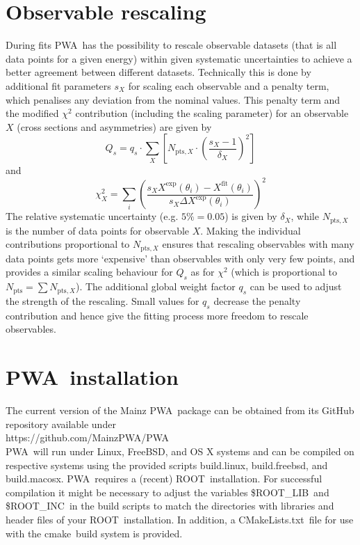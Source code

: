\documentclass[a4paper,10pt]{article}
\def\PWA{\ttfamily PWA\rmfamily\ }
\def\tt{\ttfamily}
\def\rm{\rmfamily}
\begin{document}
\section{Observable rescaling}

During fits \PWA has the possibility to rescale observable datasets (that is all data points for a given energy)
within given systematic uncertainties to achieve a better agreement between
different datasets. Technically this is done by additional fit parameters $s_X$ for scaling each
observable and a penalty term, which penalises any deviation from the nominal values. This penalty term and the modified $\chi^2$
contribution (including the scaling parameter) for an observable $X$ (cross sections and asymmetries) are given by
\begin{displaymath}
 Q_s = q_s\cdot \sum\limits_X\left[ N_{\mathrm{pts},X} \cdot \left(\frac{s_X - 1}{\delta_X}\right)^2\right]
\end{displaymath}
and
\begin{displaymath}
\chi_X^2
= \sum\limits_i \left(
\frac
{s_X X^\mathrm{exp}(\theta_i) - X^\mathrm{fit}(\theta_i)}
{s_X\Delta X^\mathrm{exp}(\theta_i)}
\right)^2
\end{displaymath}
The relative systematic uncertainty (e.g. $5\% = 0.05$) is given by $\delta_X$, while $N_{\mathrm{pts},X}$
is the number of data points for observable $X$. Making the individual contributions proportional
to  $N_{\mathrm{pts},X}$ ensures that rescaling observables with many data points gets more `expensive'
than observables with only very few points, and provides a similar scaling behaviour
for $Q_s$ as  for $\chi^2$ (which is proportional to $N_\mathrm{pts} = \sum N_{\mathrm{pts},X} $).
The additional global weight factor $q_s$ can be used to adjust the strength of the rescaling. Small values for
$q_s$ decrease the penalty contribution and hence give the fitting process more freedom to rescale observables.

\section{\PWA installation}

The current version of the Mainz \PWA package can be obtained from its GitHub repository available under\\
\tt https://github.com/MainzPWA/PWA\rm \\
\PWA will run under Linux, FreeBSD, and OS X systems and can be compiled on respective systems using the provided
scripts \tt build.linux\rm, \tt build.freebsd\rm, and \tt build.macosx\rm. \PWA requires a (recent) \tt ROOT\rm\ installation.
For successful compilation it might be necessary to adjust the variables \tt \$ROOT\_LIB\rm\ and \tt \$ROOT\_INC\rm\
in the build scripts to match the directories with libraries and header files of your \tt ROOT\rm\ installation.
In addition, a \tt CMakeLists.txt\rm\ file for use with the \tt cmake\rm\ build system is provided.
\end{document}
